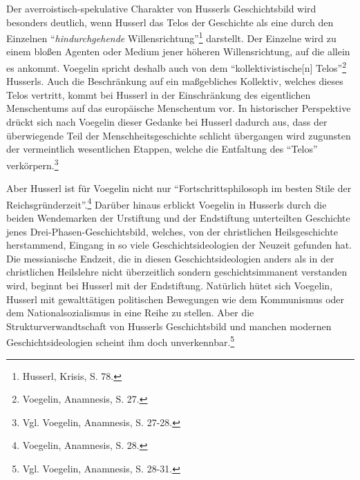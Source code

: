 Der averroistisch-spekulative Charakter von Husserls Geschichtsbild wird
besonders deutlich, wenn Husserl das Telos der Geschichte als eine durch den
Einzelnen "`{\it hindurchgehende} Willensrichtung"'\footnote{Husserl, Krisis,
  S. 78.} darstellt. Der Einzelne wird zu einem bloßen Agenten oder Medium
jener höheren Willensrichtung, auf die allein es ankommt. Voegelin spricht
deshalb auch von dem "`kollektivistische[n] Telos"'\footnote{Voegelin,
  Anamnesis, S. 27.} Husserls. Auch die Beschränkung auf ein maßgebliches
Kollektiv, welches dieses Telos vertritt, kommt bei Husserl in der
Einschränkung des eigentlichen Menschentums auf das europäische Menschentum
vor. In historischer Perspektive drückt sich nach Voegelin dieser Gedanke
bei Husserl dadurch aus, dass der überwiegende Teil der Menschheitsgeschichte
schlicht übergangen wird zugunsten der vermeintlich wesentlichen Etappen,
welche die Entfaltung des "`Telos"' verkörpern.\footnote{Vgl. Voegelin,
  Anamnesis, S. 27-28.}

Aber Husserl ist für Voegelin nicht nur "`Fortschrittsphilosoph im besten
Stile der Reichsgründerzeit"'.\footnote{Voegelin, Anamnesis, S. 28.} Darüber
hinaus erblickt Voegelin in Husserls durch die beiden Wendemarken der
Urstiftung und der Endstiftung unterteilten Geschichte jenes
Drei-Phasen-Geschichtsbild, welches, von der christlichen Heilsgeschichte
herstammend, Eingang in so viele Geschichtsideologien der Neuzeit gefunden
hat.  Die messianische Endzeit, die in diesen Geschichtsideologien anders als
in der christlichen Heilslehre nicht überzeitlich sondern geschichtsimmanent
verstanden wird, beginnt bei Husserl mit der Endstiftung. Natürlich hütet sich
Voegelin, Husserl mit gewalttätigen politischen Bewegungen wie dem Kommunismus
oder dem Nationalsozialismus in eine Reihe zu stellen. Aber die
Strukturverwandtschaft von Husserls Geschichtsbild und manchen modernen
Geschichtsideologien scheint ihm doch unverkennbar.\footnote{Vgl. Voegelin,
  Anamnesis, S. 28-31.}

